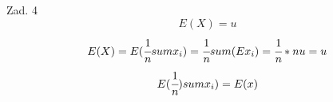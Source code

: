 \documentclass{article}
\begin{document}
Zad. 4  
$$
E(X)=u
$$
$$
E(X)=E(\cfrac{1}{n} sum x_{i})=\cfrac{1}{n} sum(Ex_{i})=\cfrac{1}{n}*nu=u
$$
$$
E(\cfrac{1}{n}) sum x_{i})=E(x)
$$
\end{document}
